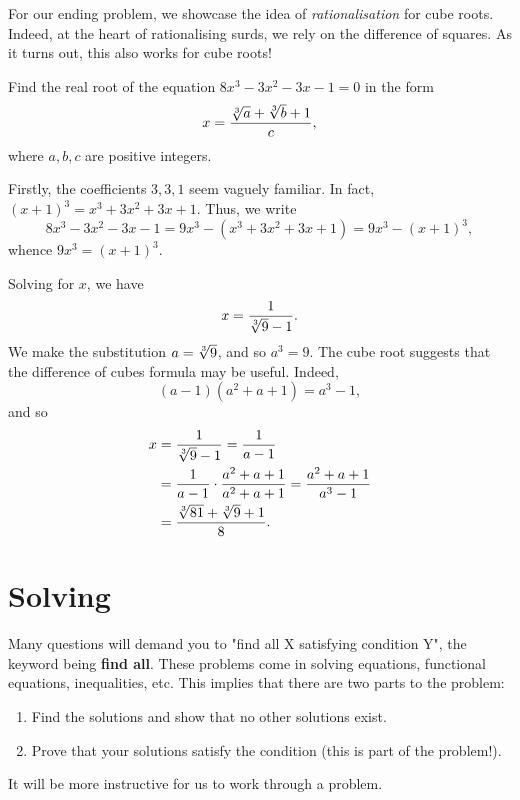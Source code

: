\documentclass[../jarvis.tex]{subfiles}
\begin{document}
For our ending problem, we showcase the idea of \textit{rationalisation} for cube roots. Indeed, at the heart of rationalising surds, we rely on the difference of squares. As it turns out, this also works for cube roots! 
\begin{example}[2013 AIME II/5]
    Find the real root of the equation $8x^3-3x^2-3x-1=0$ in the form 
    $$x=\frac{\sqrt[3]{a}+\sqrt[3]{b}+1}{c},$$
    where $a,b,c$ are positive integers.
\end{example}
Firstly, the coefficients $3, 3, 1$ seem vaguely familiar. In fact, $(x+1)^3=x^3+3x^2+3x+1$. Thus, we write
$$8x^3-3x^2-3x-1=9x^3-(x^3+3x^2+3x+1)=9x^3-(x+1)^3,$$
whence $9x^3=(x+1)^3$.

Solving for $x$, we have $$x=\frac{1}{\sqrt[3]{9}-1}.$$ We make the substitution $a=\sqrt[3]{9}$, and so $a^3=9$. The cube root suggests that the difference of cubes formula may be useful. Indeed, $$(a-1)(a^2+a+1)=a^3-1,$$ and so
\begin{align*}
    x&=\frac{1}{\sqrt[3]{9}-1}=\frac{1}{a-1} \\
    &=\frac{1}{a-1}\cdot \frac{a^2+a+1}{a^2+a+1}=\frac{a^2+a+1}{a^3-1} \\
    &=\frac{\sqrt[3]{81}+\sqrt[3]{9}+1}{8}.
\end{align*}

\section{Solving \ez}
Many questions will demand you to "find all X satisfying condition Y", the keyword being \textbf{find all}. These problems come in solving equations, functional equations, inequalities, etc. This implies that there are two parts to the problem: 
\begin{enumerate}
    \item Find the solutions and show that no other solutions exist.
    \item Prove that your solutions satisfy the condition (this is part of the problem!).
\end{enumerate}
It will be more instructive for us to work through a problem.
\end{document}
